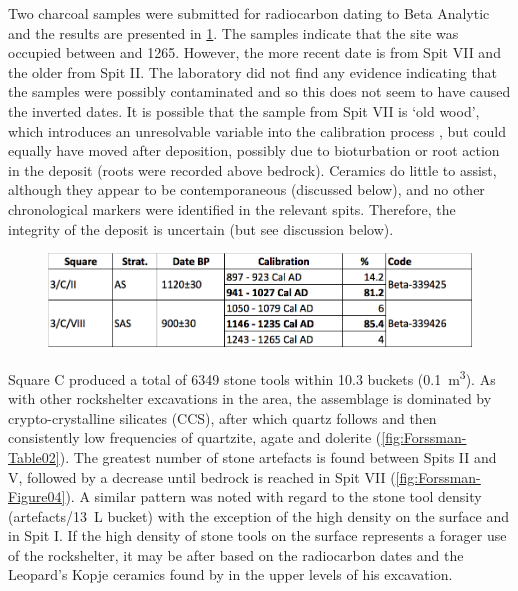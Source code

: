 Two charcoal samples were submitted for radiocarbon dating to Beta Analytic and the results are presented in \cref{fig:Forssman-Table01}. 
The samples indicate that the site was occupied between  and 1265. 
However, the more recent date is from Spit VII and the older from Spit II. 
The laboratory did not find any evidence indicating that the samples were possibly contaminated and so this does not seem to have caused the inverted dates. 
It is possible that the sample from Spit VII is ‘old wood’, which introduces an unresolvable variable into the calibration process \parencite{Kennett_2002}, but could equally have moved after deposition, possibly due to bioturbation \parencite[see][]{Lancaster_2003} or root action in the deposit (roots were recorded above bedrock). 
Ceramics do little to assist, although they appear to be contemporaneous (discussed below), and no other chronological markers were identified in the relevant spits. Therefore, the integrity of the deposit is uncertain (but see discussion below).

	\begin{figure} %
		\includegraphics[width=\linewidth]{figures/Forssman-Table01}
		\label{fig:Forssman-Table01}
	\end{figure}


Square C  produced a total of \num{6349} stone tools within \num{10.3} buckets (\SI{0.1}{\meter\cubed}). 
As with other rockshelter excavations in the area, the assemblage is dominated by crypto-crystalline silicates (CCS), 
after which quartz follows and then consistently low frequencies of quartzite, agate and dolerite (\cref{fig:Forssman-Table02}). 
The greatest number of stone artefacts is found between Spits II and V, 
followed by a decrease until bedrock is reached in Spit VII (\cref{fig:Forssman-Figure04}).
A similar pattern was noted with regard to the stone tool density (artefacts/\SI{13}{\liter} bucket) with the exception of the high density on the surface and in Spit I. 
If the high density of stone tools on the surface represents a forager use of the rockshelter, it may be after  based on the radiocarbon dates and the Leopard’s Kopje ceramics found by \textcite{Walker_1994} in the upper levels of his excavation. 

